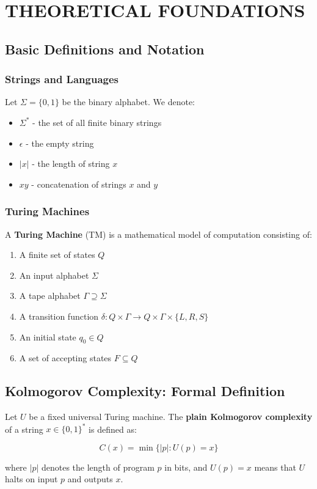 \documentclass[12pt,a4paper]{report}
\begin{document}
\chapter{THEORETICAL FOUNDATIONS}

\section{Basic Definitions and Notation}

\subsection{Strings and Languages}

Let $\Sigma = \{0,1\}$ be the binary alphabet. We denote:
\begin{itemize}
    \item $\Sigma^*$ - the set of all finite binary strings
    \item $\epsilon$ - the empty string
    \item $|x|$ - the length of string $x$
    \item $xy$ - concatenation of strings $x$ and $y$
\end{itemize}

\subsection{Turing Machines}

A \textbf{Turing Machine} (TM) is a mathematical model of computation consisting of:
\begin{enumerate}
    \item A finite set of states $Q$
    \item An input alphabet $\Sigma$
    \item A tape alphabet $\Gamma \supseteq \Sigma$
    \item A transition function $\delta: Q \times \Gamma \rightarrow Q \times \Gamma \times \{L, R, S\}$
    \item An initial state $q_0 \in Q$
    \item A set of accepting states $F \subseteq Q$
\end{enumerate}

\section{Kolmogorov Complexity: Formal Definition}

\begin{definition}
Let $U$ be a fixed universal Turing machine. The \textbf{plain Kolmogorov complexity} of a string $x \in \{0,1\}^*$ is defined as:

\begin{equation}
C(x) = \min\{|p| : U(p) = x\}
\end{equation}

where $|p|$ denotes the length of program $p$ in bits, and $U(p) = x$ means that $U$ halts on input $p$ and outputs $x$.
\end{definition}
\end{document}
